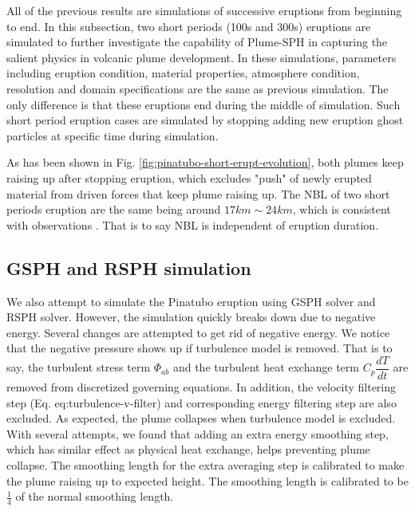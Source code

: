 All of the previous results are simulations of successive eruptions from beginning to end. In this subsection, two short periods (100s and 300s) eruptions are simulated to further investigate the capability of Plume-SPH in capturing the salient physics in volcanic plume development. In these simulations, parameters including eruption condition, material properties, atmosphere condition, resolution and domain specifications are the same as previous simulation. The only difference is that these eruptions end during the middle of simulation. Such short period eruption cases are simulated by stopping adding new eruption ghost particles at specific time during simulation.

As has been shown in Fig. \ref{fig:pinatubo-short-erupt-evolution}, both plumes keep raising up after stopping eruption, which excludes "push" of newly erupted material from driven forces that keep plume raising up. The NBL of two short periods eruption are the same being around $17 km \sim 24 km$, which is consistent with observations \citep[][e.g.]{jager1992pinatubo, avdyushin19931, defoor1992early}. That is to say NBL is independent of eruption duration.

\subsection{GSPH and RSPH simulation}
We also attempt to simulate the Pinatubo eruption using GSPH solver and RSPH solver. However, the simulation quickly breaks down due to negative energy. Several changes are attempted to get rid of negative energy.
We notice that the negative pressure shows up if turbulence model is removed. That is to say, the turbulent stress term $\Phi_{ab}$ and the turbulent heat exchange term $C_p \dfrac{dT}{dt}$ are removed from discretized governing equations. In addition, the velocity filtering step (Eq. {eq:turbulence-v-filter}) and corresponding energy filtering step are also excluded. As expected, the plume collapses when turbulence model is excluded. With several attempts, we found that adding an extra energy smoothing step, which has similar effect as physical heat exchange, helps preventing plume collapse. The smoothing length for the extra averaging step is calibrated to make the plume raising up to expected height. The smoothing length is calibrated to be $\frac{1}{4}$  of the normal smoothing length.

